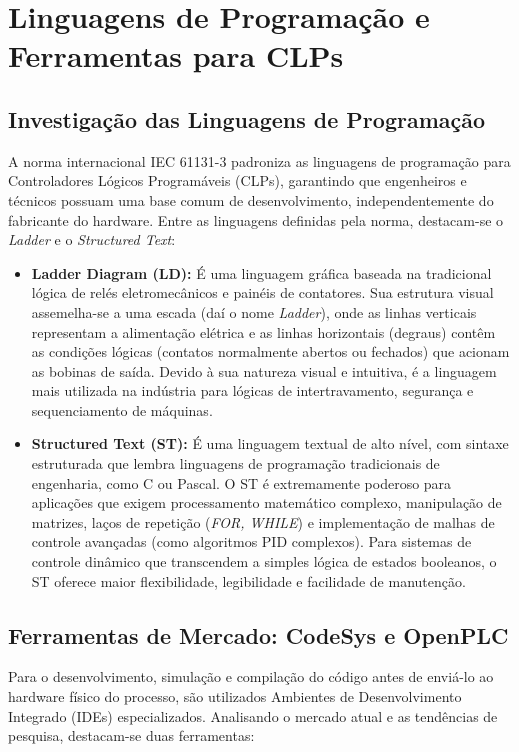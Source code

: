 \documentclass[12pt]{article}
\begin{document}
\section{Linguagens de Programação e Ferramentas para CLPs}

\subsection{Investigação das Linguagens de Programação}
A norma internacional IEC 61131-3 padroniza as linguagens de programação para Controladores Lógicos Programáveis (CLPs), garantindo que engenheiros e técnicos possuam uma base comum de desenvolvimento, independentemente do fabricante do hardware. Entre as linguagens definidas pela norma, destacam-se o \textit{Ladder} e o \textit{Structured Text}:

\begin{itemize}
    \item \textbf{Ladder Diagram (LD):} É uma linguagem gráfica baseada na tradicional lógica de relés eletromecânicos e painéis de contatores. Sua estrutura visual assemelha-se a uma escada (daí o nome \textit{Ladder}), onde as linhas verticais representam a alimentação elétrica e as linhas horizontais (degraus) contêm as condições lógicas (contatos normalmente abertos ou fechados) que acionam as bobinas de saída. Devido à sua natureza visual e intuitiva, é a linguagem mais utilizada na indústria para lógicas de intertravamento, segurança e sequenciamento de máquinas.
    \item \textbf{Structured Text (ST):} É uma linguagem textual de alto nível, com sintaxe estruturada que lembra linguagens de programação tradicionais de engenharia, como C ou Pascal. O ST é extremamente poderoso para aplicações que exigem processamento matemático complexo, manipulação de matrizes, laços de repetição (\textit{FOR, WHILE}) e implementação de malhas de controle avançadas (como algoritmos PID complexos). Para sistemas de controle dinâmico que transcendem a simples lógica de estados booleanos, o ST oferece maior flexibilidade, legibilidade e facilidade de manutenção.
\end{itemize}

\subsection{Ferramentas de Mercado: CodeSys e OpenPLC}
Para o desenvolvimento, simulação e compilação do código antes de enviá-lo ao hardware físico do processo, são utilizados Ambientes de Desenvolvimento Integrado (IDEs) especializados. Analisando o mercado atual e as tendências de pesquisa, destacam-se duas ferramentas:
\end{document}
